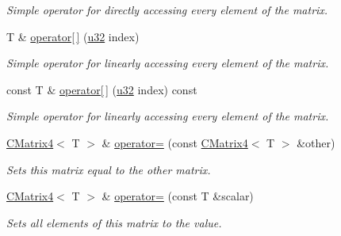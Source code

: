 \begin{DoxyCompactItemize}
\begin{DoxyCompactList}\small\item\em Simple operator for directly accessing every element of the matrix. \end{DoxyCompactList}\item 
\mbox{\label{classirr_1_1core_1_1CMatrix4_aead4909f8bb2ab40875af175caf0085f}} 
T \& \hyperlink{classirr_1_1core_1_1CMatrix4_aead4909f8bb2ab40875af175caf0085f}{operator\mbox{[}$\,$\mbox{]}} (\hyperlink{namespaceirr_a0416a53257075833e7002efd0a18e804}{u32} index)
\begin{DoxyCompactList}\small\item\em Simple operator for linearly accessing every element of the matrix. \end{DoxyCompactList}\item 
\mbox{\label{classirr_1_1core_1_1CMatrix4_a9e34c4b4872d7f8fe587eff776585270}} 
const T \& \hyperlink{classirr_1_1core_1_1CMatrix4_a9e34c4b4872d7f8fe587eff776585270}{operator\mbox{[}$\,$\mbox{]}} (\hyperlink{namespaceirr_a0416a53257075833e7002efd0a18e804}{u32} index) const
\begin{DoxyCompactList}\small\item\em Simple operator for linearly accessing every element of the matrix. \end{DoxyCompactList}\item 
\mbox{\label{classirr_1_1core_1_1CMatrix4_a5e922139dd245292b7745458408509eb}} 
\hyperlink{classirr_1_1core_1_1CMatrix4}{C\+Matrix4}$<$ T $>$ \& \hyperlink{classirr_1_1core_1_1CMatrix4_a5e922139dd245292b7745458408509eb}{operator=} (const \hyperlink{classirr_1_1core_1_1CMatrix4}{C\+Matrix4}$<$ T $>$ \&other)
\begin{DoxyCompactList}\small\item\em Sets this matrix equal to the other matrix. \end{DoxyCompactList}\item 
\mbox{\label{classirr_1_1core_1_1CMatrix4_af4fe1607d3ba1e9ebcf8028e9171bad6}} 
\hyperlink{classirr_1_1core_1_1CMatrix4}{C\+Matrix4}$<$ T $>$ \& \hyperlink{classirr_1_1core_1_1CMatrix4_af4fe1607d3ba1e9ebcf8028e9171bad6}{operator=} (const T \&scalar)
\begin{DoxyCompactList}\small\item\em Sets all elements of this matrix to the value. \end{DoxyCompactList}\item 

\end{DoxyCompactItemize}
